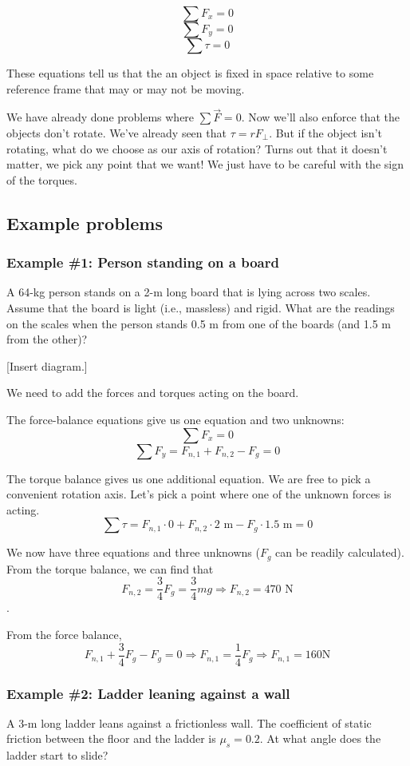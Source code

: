 $$\sum F_x = 0$$
$$\sum F_y = 0$$
$$\sum \tau = 0$$

These equations tell us that the an object is fixed in space relative to some reference frame that may or may not be moving.

We have already done problems where $\sum \vec{F}=0$. Now we'll also enforce that the objects don't rotate. We've already seen that $\tau=rF_\perp$. But if the object isn't rotating, what do we choose as our axis of rotation? Turns out that it doesn't matter, we pick any point that we want! We just have to be careful with the sign of the torques.

\subsection{Example problems}
\subsubsection{Example \#1: Person standing on a board}
A 64-kg person stands on a 2-m long board that is lying across two scales. Assume that the board is light (i.e., massless) and rigid. What are the readings on the scales when the person stands 0.5 m from one of the boards (and 1.5 m from the other)?

[Insert diagram.]
\vspace{5cm}

We need to add the forces and torques acting on the board.

The force-balance equations give us one equation and two unknowns:
$$\sum F_x = 0$$
$$\sum F_y = F_{n,1}+F_{n,2}-F_g=0$$

The torque balance gives us one additional equation. We are free to pick a convenient rotation axis. Let's pick a point where one of the unknown forces is acting.
$$\sum \tau = F_{n,1}\cdot{0}+F_{n,2}\cdot{2\mbox{ m}}-F_g\cdot{1.5\mbox{ m}}=0$$

We now have three equations and three unknowns ($F_g$ can be readily calculated). From the torque balance, we can find that
$$F_{n,2}=\frac{3}{4}F_g=\frac{3}{4}mg\Rightarrow \boxed{F_{n,2}=470\mbox{ N}}$$.

From the force balance,
$$F_{n,1}+\frac{3}{4}F_g-F_g=0\Rightarrow F_{n,1}=\frac{1}{4}F_g\Rightarrow \boxed{F_{n,1}=160 \mbox{N}}$$

\subsubsection{Example \#2: Ladder leaning against a wall}
A 3-m long ladder leans against a frictionless wall. The coefficient of static friction between the floor and the ladder is $\mu_s=0.2$. At what angle does the ladder start to slide?

